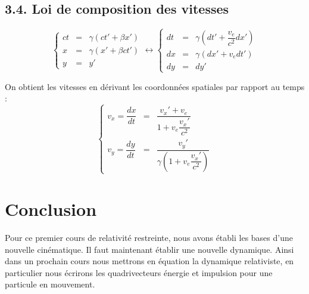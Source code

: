 \documentclass[french, a4paper, 10pt, twocolumn, landscape]{article}
\begin{document}
\subsection*{3.4. Loi de composition des vitesses}

\begin{equation}
	\left\{\begin{array}{rcl}
		ct &=& \gamma\left(ct'+\beta x'\right)\\
		x &=& \gamma\left(x'+\beta ct'\right)\\
		y &=& y'
	\end{array}\right.\leftrightarrow \left\{\begin{array}{rcl}
		dt &=& \gamma\left(dt'+\dfrac{v_e}{c^2} dx'\right)\\
		dx &=& \gamma\left(dx'+v_e dt'\right)\\
		dy &=& dy'
	\end{array}\right. \nonumber
\end{equation}

On obtient les vitesses en dérivant les coordonnées spatiales par rapport au temps : 
\begin{equation}
	\left\{\begin{array}{rcl}
		v_x = \dfrac{dx}{dt} &=& \dfrac{v_x'+v_e}{1+v_e\dfrac{v_x'}{c^2}}\\
		v_y = \dfrac{dy}{dt} &=& \dfrac{v_y'}{\gamma(1+v_e\dfrac{v_x'}{c^2})}
	\end{array}\right.
\end{equation}

\section*{Conclusion}

Pour ce premier cours de relativité restreinte, nous avons établi les bases d'une nouvelle cinématique. Il faut maintenant établir une nouvelle dynamique. Ainsi dans un prochain cours nous mettrons en équation la dynamique relativiste, en particulier nous écrirons les quadrivecteurs énergie et impulsion pour une particule en mouvement.
\end{document}
